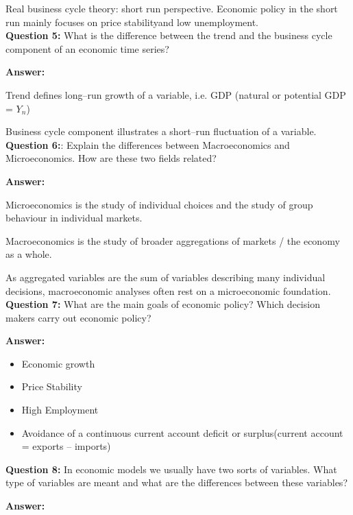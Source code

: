 \documentclass[a4paper]{article}
\begin{document}
Real business cycle theory: short run perspective. Economic policy in the short run mainly focuses on price stabilityand low unemployment. \\

\textbf{Question 5:} What is the difference between the trend and the business cycle component of an economic time series? 

\textbf{Answer:}

Trend defines long--run growth of a variable, i.e. GDP (natural or potential GDP = $Y_{n}$)

Business cycle component illustrates a short--run fluctuation of a variable. \\

\textbf{Question 6:}: Explain the differences between Macroeconomics and Microeconomics. How are these two fields related? 

\textbf{Answer:} 

Microeconomics is the study of individual choices and the study of group behaviour in individual markets.

Macroeconomics is the study of broader aggregations of markets / the economy as a whole.

As aggregated variables are the sum of variables describing many individual decisions, macroeconomic analyses often rest on a microeconomic foundation. \\

\textbf{Question 7:} What are the main goals of economic policy? Which decision makers carry out economic policy? 

\textbf{Answer:} 
\begin{itemize}

\item Economic growth

\item Price Stability

\item High Employment

\item Avoidance of a continuous current account deficit or surplus(current account = exports – imports) \\

\end{itemize}

\textbf{Question 8:} In economic models we usually have two sorts of variables. What type of variables are meant and what are the differences between these variables? 

\textbf{Answer:} 
\end{document}

